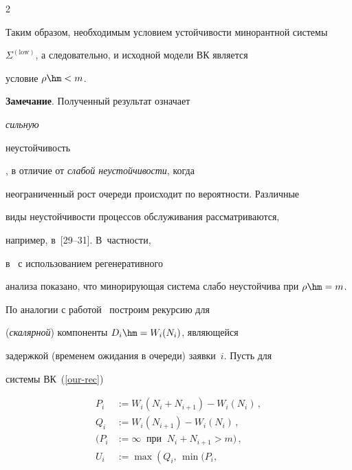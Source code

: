 \begin{multicols}{2}
\begin{equation*}
\end{equation*}



\medskip



Таким образом, необходимым условием устойчивости минорантной сис\-те\-мы

$\Sigma^{(\mathrm{low})}$, а следовательно, и исходной модели ВК является

условие $\rho\hm<m$.



\smallskip



\noindent

\textbf{Замечание}.  Полученный результат означает {\it сильную

неустойчивость}, в отличие от {\it слабой неустой\-чивости}, когда

неограниченный рост очереди \mbox{происходит} по вероятности. Различные

виды неустойчивости  процессов обслуживания рассматриваются,

например, в~[29--31]. В~част\-ности,

в~\cite{MorozovJMS} с использованием регенеративного

анализа показано, что минорирующая система слабо неустойчива при  $\rho\hm=m$.



По аналогии с работой~\cite{scheller-sigman97} построим рекурсию для

({\it скалярной}) компоненты $D_{i}\hm=W_{i}(N_{i})$, явля\-ющей\-ся

задержкой (временем ожидания в очереди)  заявки~$i$. Пусть для

сис\-те\-мы ВК~(\ref{our-rec})

\begin{equation}

\left.

\begin{array}{rl}

P_i&:=W_i(N_i+N_{i+1})-W_i(N_i)\,,\\[9pt]

Q_i&:=W_i(N_{i+1})-W_i(N_i)\,,\\[9pt]

(P_i&:=\infty\;\; \mbox{при}\;\;

N_i+N_{i+1}>m)\,,\\[9pt]

U_i&:=\max\left (Q_i,\, \min(P_i,\,


\end{array}
\end{equation}
\end{multicols}
